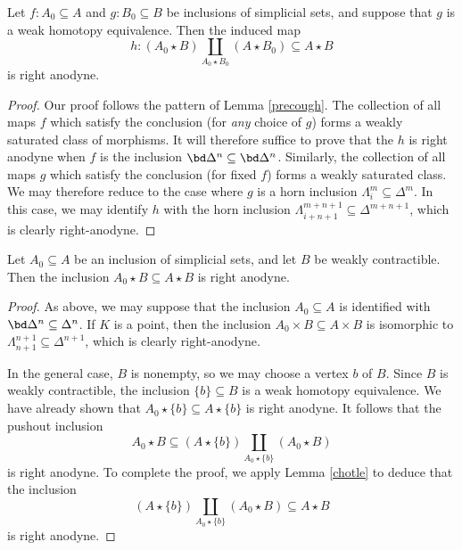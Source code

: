 \begin{lemma}\label{chotle}
Let $f: A_0 \subseteq A$ and $g: B_0 \subseteq B$ be inclusions of simplicial sets, and suppose
that $g$ is a weak homotopy equivalence. Then the induced map
$$h: (A_0 \star B) \coprod_{ A_0 \star B_0} (A \star B_0) \subseteq A \star B$$ is right anodyne.
\end{lemma}

\begin{proof}
Our proof follows the pattern of Lemma \ref{precough}. The collection of all maps $f$ which
satisfy the conclusion (for {\em any} choice of $g$) forms a weakly saturated class of morphisms. It will therefore suffice to prove that the $h$ is right anodyne when $f$ is the inclusion $\bd \Delta^n \subseteq \bd \Delta^n$. Similarly, the collection of all maps $g$ which satisfy the conclusion (for fixed $f$) forms a weakly saturated class. We may therefore reduce to the case where $g$ is a horn inclusion $\Lambda^m_i \subseteq \Delta^m$. In this case, we may identify $h$ with the horn inclusion $\Lambda^{m+n+1}_{i+n+1} \subseteq \Delta^{m+n+1}$, which is clearly right-anodyne.
\end{proof}

\begin{lemma}\label{chotle2}
Let $A_0 \subseteq A$ be an inclusion of simplicial sets, and let
$B$ be weakly contractible. Then the inclusion $A_0 \star B
\subseteq A \star B$ is right anodyne.
\end{lemma}

\begin{proof}
As above, we may suppose that the inclusion $A_0 \subseteq A$ is identified with
$ \bd \Delta^n \subseteq \Delta^n$. If $K$ is a point, then the inclusion $A_0 \times B \subseteq A \times B$ is 
isomorphic to $\Lambda^{n+1}_{n+1}
\subseteq \Delta^{n+1}$, which is clearly right-anodyne.

In the general case, $B$ is nonempty, so we may choose a vertex
$b$ of $B$. Since $B$ is weakly contractible, the inclusion $\{b\}
\subseteq B$ is a weak homotopy equivalence. We have already shown
that $A_0 \star \{b\} \subseteq A \star \{b\}$ is right anodyne. It
follows that the pushout inclusion
$$A_0 \star B \subseteq (A \star \{b\}) \coprod_{ A_0 \star \{b\} } (A_0
\star B)$$ is right anodyne. To complete the proof, we apply Lemma
\ref{chotle} to deduce that the inclusion
$$  (A \star \{b\}) \coprod_{ A_0 \star \{b\} } (A_0
\star B) \subseteq A \star B$$ is right anodyne.
\end{proof}

